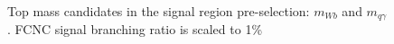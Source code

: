 \begin{figure}[h!]
\caption{Top mass candidates in the signal region pre-selection: $m_{W b}$ and $m_{q\gamma}$. FCNC signal branching ratio is scaled to 1\%}
\label{fig:PreSelTopMasses}
\end{figure}




